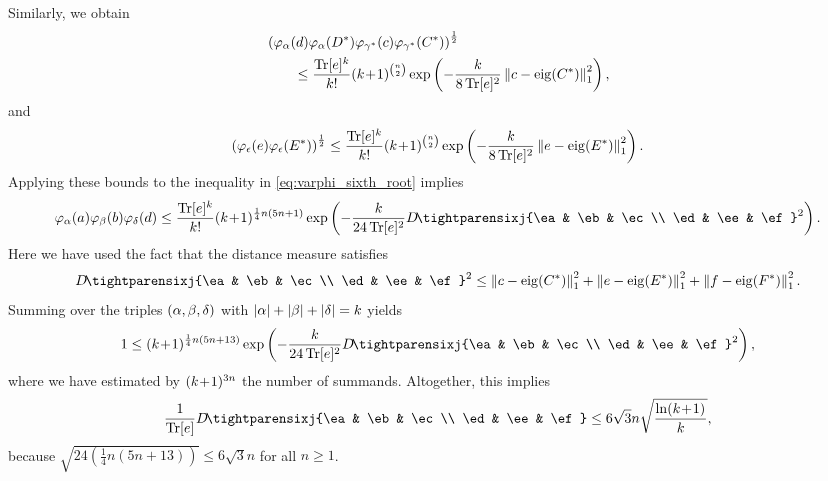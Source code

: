 \documentclass[notitlepage, 11pt, letterpaper]{amsart}
\begin{document}
Similarly, we obtain
\begin{align}
    \begin{split}
        &\left( \varphi_\alpha(d) \varphi_{\alpha}(D^*) \varphi_{\gamma^*}(c) \varphi_{\gamma^*}(C^*)\right)^{\frac{1}{2}}\\
        &\qquad\leq
        \frac{\operatorname{Tr}[e]^k}{k!} (k\!+\!1)^{\binom{n}{2}} \exp\left(-\frac{k}{8\operatorname{Tr}[e]^2} \left\lVert c - \operatorname{eig}(C^*)\right\rVert_1^2\right),
    \end{split}
\end{align}
and
\begin{equation}
    \left( \varphi_\epsilon(e) \varphi_{\epsilon}(E^*) \right)^{\frac{1}{2}} \leq
    \frac{\operatorname{Tr}[e]^k}{k!} (k\!+\!1)^{\binom{n}{2}}
    \exp\left( - \frac{k}{8\operatorname{Tr}[e]^2} \left\lVert e- \operatorname{eig}(E^*)\right\rVert_1^2\right).
\end{equation}
Applying these bounds to the inequality in \cref{eq:varphi_sixth_root} implies
\begin{equation}
    \vp_{\ya}(\ea) \vp_{\yb}(\eb) \vp_{\yd}(\ed) \leq
    \frac{\tee^k}{k!} \polyk{\frac{1}{4}n(5n+1)}
    \exp\left( - \frac{k}{24\tee^2} D\!\tightparensixj{\ea & \eb & \ec \\ \ed & \ee & \ef}^2 \right).
\end{equation}
Here we have used the fact that the distance measure satisfies
\begin{equation}
    D\!\tightparensixj{\ea & \eb & \ec \\ \ed & \ee & \ef}^{2}
    \leq
    \norm{\ec- \eig(C^*)}_1^2 + \norm{\ee- \eig(E^*)}_1^2 + \norm{\ef- \eig(F^*)}_1^2.
\end{equation}
Summing over the triples $(\alpha, \beta, \delta)$ with $|\alpha|+|\beta|+|\delta|=k$ yields
\begin{equation}
    1 \leq
    \polyk{\frac{1}{4}n(5n+13)}
    \exp\left( - \frac{k}{24\tee^2} D\!\tightparensixj{\ea & \eb & \ec \\ \ed & \ee & \ef}^2 \right),
\end{equation}
where we have estimated by $(k\!+\!1)^{3n}$ the number of summands.
Altogether, this implies%
\begin{equation}
    \label{eq:final_estimate}
    \frac{1}{\tee} D\!\tightparensixj{\ea & \eb & \ec \\ \ed & \ee & \ef} \leq 6 \sqrt{3} n \sqrt{\frac{\ln \polyk{} }{k}},
\end{equation}
because $\sqrt{24(\frac{1}{4}n(5n+13))} \leq 6 \sqrt{3} n$ for all $n \geq 1$.
\end{document}
